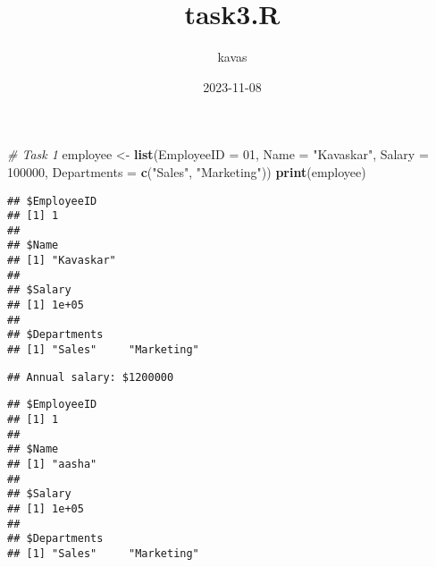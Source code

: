 \documentclass[
]{article}
\title{task3.R}
\author{kavas}
\date{2023-11-08}
\newenvironment{Shaded}{\begin{snugshade}}{\end{snugshade}}
\newcommand{\AttributeTok}[1]{\textcolor[rgb]{0.13,0.29,0.53}{#1}}
\newcommand{\CommentTok}[1]{\textcolor[rgb]{0.56,0.35,0.01}{\textit{#1}}}
\newcommand{\DecValTok}[1]{\textcolor[rgb]{0.00,0.00,0.81}{#1}}
\newcommand{\FunctionTok}[1]{\textcolor[rgb]{0.13,0.29,0.53}{\textbf{#1}}}
\newcommand{\NormalTok}[1]{#1}
\newcommand{\OtherTok}[1]{\textcolor[rgb]{0.56,0.35,0.01}{#1}}
\newcommand{\SpecialCharTok}[1]{\textcolor[rgb]{0.81,0.36,0.00}{\textbf{#1}}}
\newcommand{\StringTok}[1]{\textcolor[rgb]{0.31,0.60,0.02}{#1}}
\begin{document}
\maketitle

\begin{Shaded}
\begin{Highlighting}[]
\CommentTok{\# Task 1}
\NormalTok{employee }\OtherTok{\textless{}{-}} \FunctionTok{list}\NormalTok{(}\AttributeTok{EmployeeID =} \DecValTok{01}\NormalTok{, }\AttributeTok{Name =} \StringTok{"Kavaskar"}\NormalTok{, }\AttributeTok{Salary =} \DecValTok{100000}\NormalTok{, }\AttributeTok{Departments =} \FunctionTok{c}\NormalTok{(}\StringTok{"Sales"}\NormalTok{, }\StringTok{"Marketing"}\NormalTok{))}
\FunctionTok{print}\NormalTok{(employee)}
\end{Highlighting}
\end{Shaded}

\begin{verbatim}
## $EmployeeID
## [1] 1
## 
## $Name
## [1] "Kavaskar"
## 
## $Salary
## [1] 1e+05
## 
## $Departments
## [1] "Sales"     "Marketing"
\end{verbatim}

\begin{Shaded}
\end{Shaded}

\begin{verbatim}
## Annual salary: $1200000
\end{verbatim}

\begin{Shaded}
\end{Shaded}

\begin{verbatim}
## $EmployeeID
## [1] 1
## 
## $Name
## [1] "aasha"
## 
## $Salary
## [1] 1e+05
## 
## $Departments
## [1] "Sales"     "Marketing"
\end{verbatim}
\end{document}
